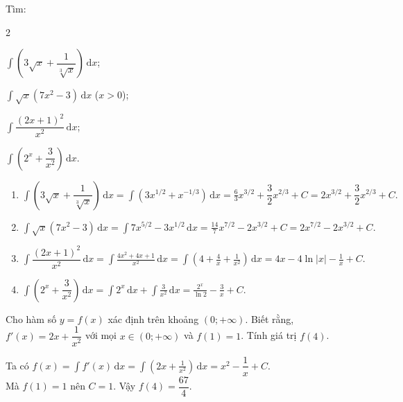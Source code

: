 \documentclass[12pt,aspectratio=169]{beamer}
\begin{document}
\begin{baitap}%
	Tìm:
	\begin{enumEX}{2}
		\item $\displaystyle\int\left(3\sqrt{x}+\dfrac{1}{\sqrt[3]{x}}\right)\mathrm{\,d}x$;
		\item $\displaystyle\int\sqrt{x}\left(7x^2-3\right)\mathrm{\,d}x$ ($x>0$);
		\item $\displaystyle\int \dfrac{(2x+1)^2}{x^2}\mathrm{\,d}x$;
		\item $\displaystyle\int \left(2^x + \dfrac{3}{x^2}\right)\mathrm{\,d}x$.
	\end{enumEX}

	\begin{loigiai}
		\begin{enumerate}
			\item $\displaystyle\int\left(3\sqrt{x}+\dfrac{1}{\sqrt[3]{x}}\right)\mathrm{\,d}x = \int \left(3x^{1/2} + x^{-1/3}\right) \mathrm{\,d}x = \frac{6}{3}x^{3/2} + \dfrac{3}{2}x^{2/3} + C = 2x^{3/2} + \dfrac{3}{2}x^{2/3} + C.$

			\item $\displaystyle\int\sqrt{x}(7x^2-3)\mathrm{\,d}x = \int 7x^{5/2} - 3x^{1/2} \mathrm{\,d}x = \frac{14}{7}x^{7/2} - 2x^{3/2} + C = 2x^{7/2} - 2x^{3/2} + C.$

			\item $\displaystyle\int \dfrac{(2x+1)^2}{x^2}\mathrm{\,d}x = \int \frac{4x^2 + 4x + 1}{x^2} \mathrm{\,d}x = \int \left(4 + \frac{4}{x} + \frac{1}{x^2}\right) \mathrm{\,d}x = 4x - 4\ln|x| - \frac{1}{x} + C.$

			\item $\displaystyle\int \left(2^x + \dfrac{3}{x^2}\right)\mathrm{\,d}x = \int 2^x \mathrm{\,d}x + \int \frac{3}{x^2} \mathrm{\,d}x = \frac{2^x}{\ln 2} - \frac{3}{x} + C.$
		\end{enumerate}
	\end{loigiai}
\end{baitap}

\begin{baitap}%
	Cho hàm số $y = f(x)$ xác định trên khoảng $(0; +\infty)$. Biết rằng, $f'(x) = 2x + \dfrac{1}{x^2}$ với mọi $x \in (0; +\infty)$ và $f(1) = 1$. Tính giá trị $f(4)$.

	\begin{loigiai}
		Ta có $\displaystyle f(x)=\int f'(x)\mathrm{\,d}x=\int \left(2x+\frac{1}{x^2}\right)\mathrm{\,d}x= x^2-\dfrac{1}{x}+C $.\\
		Mà $f(1)=1$ nên $C=1$. Vậy $f(4)=\dfrac{67}{4}$.
	\end{loigiai}
\end{baitap}
\end{document}
